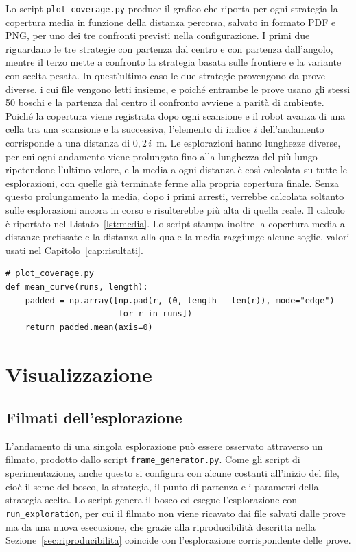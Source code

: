 Lo script \texttt{plot\_coverage.py} produce il grafico che riporta per ogni strategia la copertura media in funzione della distanza percorsa, salvato in formato PDF e PNG, per uno dei tre confronti previsti nella configurazione. I primi due riguardano le tre strategie con partenza dal centro e con partenza dall'angolo, mentre il terzo mette a confronto la strategia basata sulle frontiere e la variante con scelta pesata. In quest'ultimo caso le due strategie provengono da prove diverse, i cui file vengono letti insieme, e poiché entrambe le prove usano gli stessi 50 boschi e la partenza dal centro il confronto avviene a parità di ambiente. Poiché la copertura viene registrata dopo ogni scansione e il robot avanza di una cella tra una scansione e la successiva, l'elemento di indice $i$ dell'andamento corrisponde a una distanza di $0{,}2\,i$~m. Le esplorazioni hanno lunghezze diverse, per cui ogni andamento viene prolungato fino alla lunghezza del più lungo ripetendone l'ultimo valore, e la media a ogni distanza è così calcolata su tutte le esplorazioni, con quelle già terminate ferme alla propria copertura finale. Senza questo prolungamento la media, dopo i primi arresti, verrebbe calcolata soltanto sulle esplorazioni ancora in corso e risulterebbe più alta di quella reale. Il calcolo è riportato nel Listato~\ref{lst:media}. Lo script stampa inoltre la copertura media a distanze prefissate e la distanza alla quale la media raggiunge alcune soglie, valori usati nel Capitolo~\ref{cap:risultati}.

\begin{lstlisting}[float=!htb, label=lst:media, caption={Calcolo della copertura media sulle esplorazioni di lunghezza diversa.}]
# plot_coverage.py
def mean_curve(runs, length):
    padded = np.array([np.pad(r, (0, length - len(r)), mode="edge")
                       for r in runs])
    return padded.mean(axis=0)
\end{lstlisting}

\section{Visualizzazione}
\label{sec:visualizzazione}

\subsection{Filmati dell'esplorazione}
\label{sec:filmati}

L'andamento di una singola esplorazione può essere osservato attraverso un filmato, prodotto dallo script \texttt{frame\_generator.py}. Come gli script di sperimentazione, anche questo si configura con alcune costanti all'inizio del file, cioè il seme del bosco, la strategia, il punto di partenza e i parametri della strategia scelta. Lo script genera il bosco ed esegue l'esplorazione con \texttt{run\_exploration}, per cui il filmato non viene ricavato dai file salvati dalle prove ma da una nuova esecuzione, che grazie alla riproducibilità descritta nella Sezione~\ref{sec:riproducibilita} coincide con l'esplorazione corrispondente delle prove.

